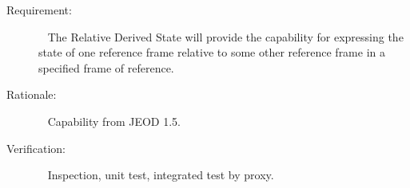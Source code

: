 
%
%
% 
%

\label{reqt:Relative}
\begin{description}
  \item[Requirement:]\ \newline
     The Relative Derived State will provide the capability for expressing the state of one reference frame relative to some other reference frame in a specified frame of reference.
  \item[Rationale:]\ \newline
     Capability from JEOD 1.5.
  \item[Verification:]\ \newline
     Inspection, unit test, integrated test by proxy.
\end{description}


